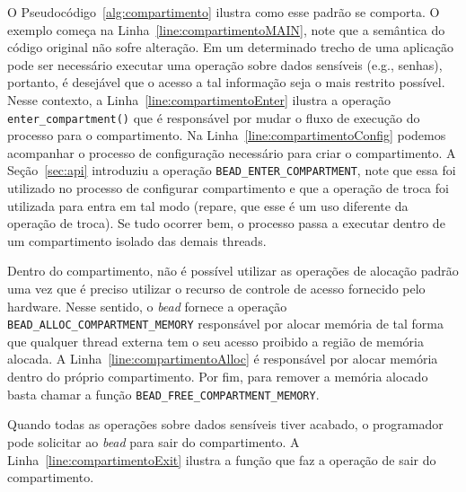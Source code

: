 O Pseudocódigo~\ref{alg:compartimento} ilustra como esse padrão se comporta. O
exemplo começa na Linha~\ref{line:compartimentoMAIN}, note que a semântica do
código original não sofre alteração. Em um determinado trecho de uma aplicação
pode ser necessário executar uma operação sobre dados sensíveis (e.g., senhas),
portanto, é desejável que o acesso a tal informação seja o mais restrito
possível. Nesse contexto, a Linha~\ref{line:compartimentoEnter} ilustra a
operação \texttt{enter\_compartment()} que é responsável por mudar o fluxo de
execução do processo para o compartimento. Na
Linha~\ref{line:compartimentoConfig} podemos acompanhar o processo de
configuração necessário para criar o compartimento. A Seção~\ref{sec:api}
introduziu a operação \texttt{BEAD\_ENTER\_COMPARTMENT}, note que essa foi
utilizado no processo de configurar compartimento e que a operação de troca foi
utilizada para entra em tal modo (repare, que esse é um uso diferente da
operação de troca). Se tudo ocorrer bem, o processo passa a executar dentro de
um compartimento isolado das demais threads.

Dentro do compartimento, não é possível utilizar as operações de alocação
padrão uma vez que é preciso utilizar o recurso de controle de acesso fornecido
pelo hardware. Nesse sentido, o \emph{bead} fornece a operação
\texttt{BEAD\_ALLOC\_COMPARTMENT\_MEMORY} responsável por alocar memória de tal
forma que qualquer thread externa tem o seu acesso proibido a região de memória
alocada. A Linha~\ref{line:compartimentoAlloc} é responsável por alocar memória
dentro do próprio compartimento. Por fim, para remover a memória alocado basta
chamar a função \texttt{BEAD\_FREE\_COMPARTMENT\_MEMORY}.

Quando todas as operações sobre dados sensíveis tiver acabado, o programador
pode solicitar ao \emph{bead} para sair do compartimento. A
Linha~\ref{line:compartimentoExit} ilustra a função que faz a operação de sair
do compartimento.
